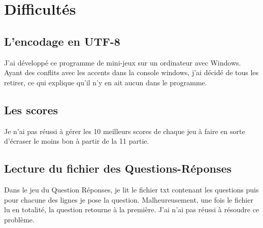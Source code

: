 \documentclass[10pt]{report}
\begin{document}
\chapter{Difficultés}
	\section{L'encodage en UTF-8}
		J'ai développé ce programme de mini-jeux sur un ordinateur avec Windows. Ayant des conflits avec les accents dans la console windows, j'ai décidé de tous les retirer, ce qui explique qu'il n'y en ait aucun dans le programme.

	\section{Les scores}
		Je n'ai pas réussi à gérer les 10 meilleurs scores de chaque jeu à faire en sorte d'écraser le moins bon à partir de la 11 partie.

	\section{Lecture du fichier des Questions-Réponses}
		Dans le jeu du Question Réponses, je lit le fichier txt contenant les questions puis pour chacune des lignes je pose la question. Malheureusement, une fois le fichier lu en totalité, la question retourne à la première. J'ai n'ai pas réussi à résoudre ce problème.
\end{document}
